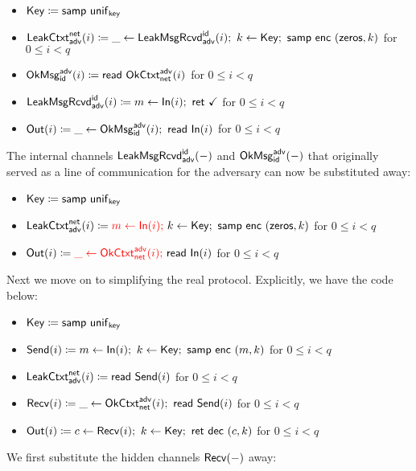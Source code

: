 \begin{itemize}
\item $\mathsf{Key} \coloneqq \mathsf{samp} \ \mathsf{unif}_{\mathsf{key}}$
\item $\LeakCtxt^\net_\adv(i) \coloneqq \_ \leftarrow \LeakMsgRcvd^\id_\adv(i); \ k \leftarrow \Key; \ \samp{\enc \ (\zeros,k)}$ for $0 \leq i < q$
\item $\mathsf{OkMsg}^{\mathsf{adv}}_{\mathsf{id}}(i) \coloneqq \mathsf{read} \ \mathsf{OkCtxt}^{\mathsf{adv}}_{\mathsf{net}}(i)$ for $0 \leq i < q$
\item $\mathsf{LeakMsgRcvd}^{\mathsf{id}}_{\mathsf{adv}}(i) \coloneqq m \leftarrow \mathsf{In}(i); \ \mathsf{ret} \ \checkmark$ for $0 \leq i < q$
\item $\mathsf{Out}(i) \coloneqq \_ \leftarrow \mathsf{OkMsg}^{\mathsf{adv}}_{\mathsf{id}}(i); \ \mathsf{read} \ \mathsf{In}(i)$ for $0 \leq i < q$
\end{itemize}

\noindent The internal channels $\mathsf{LeakMsgRcvd}^{\mathsf{id}}_{\mathsf{adv}}(-)$ and $\mathsf{OkMsg}^{\mathsf{adv}}_{\mathsf{id}}(-)$ that originally served as a line of communication for the adversary can now be substituted away:

\begin{itemize}
\item $\mathsf{Key} \coloneqq \mathsf{samp} \ \mathsf{unif}_{\mathsf{key}}$
\item $\LeakCtxt^\net_\adv(i) \coloneqq {\color{red} m \leftarrow \In(i);} \ k \leftarrow \Key; \ \samp{\enc \ (\zeros,k)}$ for $0 \leq i < q$
\item $\mathsf{Out}(i) \coloneqq {\color{red} \_ \leftarrow \mathsf{OkCtxt}^{\mathsf{adv}}_{\mathsf{net}}(i);} \ \mathsf{read} \ \mathsf{In}(i)$ for $0 \leq i < q$
\end{itemize}

\noindent Next we move on to simplifying the real protocol.  Explicitly, we have the code below:

\begin{itemize}
\item $\mathsf{Key} \coloneqq \mathsf{samp} \ \mathsf{unif}_{\mathsf{key}}$
\item $\mathsf{Send}(i) \coloneqq m \leftarrow \mathsf{In}(i); \ k \leftarrow \mathsf{Key}; \ \mathsf{samp} \ \mathsf{enc} \ (m,k)$ for $0 \leq i < q$
\item $\mathsf{LeakCtxt}^{\mathsf{net}}_{\mathsf{adv}}(i) \coloneqq \mathsf{read} \ \mathsf{Send}(i)$ for $0 \leq i < q$
\item $\mathsf{Recv}(i) \coloneqq \_ \leftarrow \mathsf{OkCtxt}^{\mathsf{adv}}_{\mathsf{net}}(i); \ \mathsf{read} \ \mathsf{Send}(i)$ for $0 \leq i < q$
\item $\mathsf{Out}(i) \coloneqq c \leftarrow \mathsf{Recv}(i); \ k \leftarrow \mathsf{Key}; \ \mathsf{ret} \ \mathsf{dec} \ (c,k)$ for $0 \leq i < q$
\end{itemize}

\noindent We first substitute the hidden channels $\mathsf{Recv}(-)$ away:

